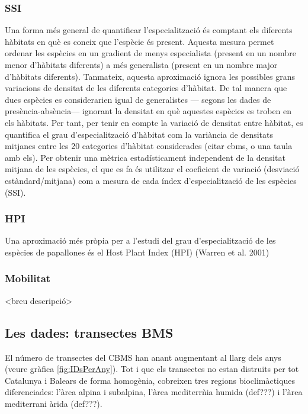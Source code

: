 \documentclass{article}
\begin{document}
\subsubsection{SSI}
Una forma més general de quantificar l'especialització és comptant els diferents hàbitats en què es coneix que l'espècie és present. Aquesta mesura permet ordenar les espècies en un gradient de menys especialista (present en un nombre menor d'hàbitats diferents) a més generalista (present en un nombre major d'hàbitats diferents). Tanmateix, aquesta aproximació ignora les possibles grans variacions de densitat de les diferents categories d'hàbitat. De tal manera que dues espècies es considerarien igual de generalistes — segons les dades de presència-absència— ignorant la densitat en què aquestes espècies es troben en els hàbitats. Per tant, per tenir en compte la variació de densitat entre hàbitat, es quantifica el grau d'especialització d'hàbitat com la variància de densitats mitjanes entre les 20 categories d'hàbitat considerades (citar cbms, o una taula amb els). Per obtenir una mètrica estadísticament independent de la densitat mitjana de les espècies, el que es fa és utilitzar el coeficient de variació (desviació estàndard/mitjana) com a mesura de cada índex d'especialització de les espècies (SSI).

\subsubsection{HPI}
Una aproximació més pròpia per a l'estudi del grau d'especialització de les espècies de papallones és el Host Plant Index (HPI) (Warren et al. 2001)


\subsubsection{Mobilitat}
<breu descripci\'o>

\subsection{Les dades: transectes BMS}
El n\'umero de transectes del CBMS han anant augmentant al llarg dels anys (veure gr\`afica \ref{fig:IDsPerAny}). Tot i que els transectes no estan distruits per tot Catalunya i Balears de forma homog\`enia, cobreixen tres regions bioclim\`actiques diferenciades: l'\`area alpina i subalpina, l'\`area mediterr\`nia humida (def???) i l'\`area mediterrani \`arida (def???). 
\end{document}
